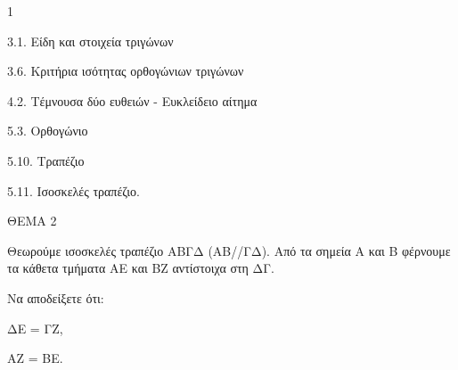 \begin{ylh}{1}
    \item 3.1. Είδη και στοιχεία τριγώνων
    \item 3.6. Κριτήρια ισότητας ορθογώνιων τριγώνων
    \item 4.2. Τέμνουσα δύο ευθειών - Ευκλείδειο αίτημα
    \item 5.3. Ορθογώνιο
    \item 5.10. Τραπέζιο
    \item 5.11. Ισοσκελές τραπέζιο.
\end{ylh}

ΘΕΜΑ 2

Θεωρούμε ισοσκελές τραπέζιο ΑΒΓΔ (ΑΒ//ΓΔ). Από τα σημεία Α και Β φέρνουμε τα κάθετα τμήματα ΑΕ και ΒΖ αντίστοιχα στη ΔΓ.

Να αποδείξετε ότι:

\begin{alist}
\item ΔΕ = ΓΖ, 

\item ΑΖ = ΒΕ. 


\begin{center}
\end{center}
\end{alist}
